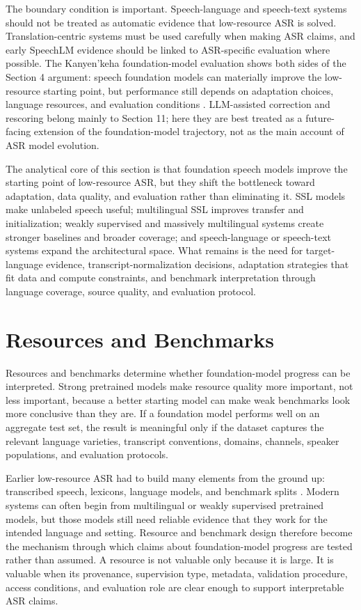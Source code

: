 \documentclass[pdflatex,sn-basic]{sn-jnl}
\theoremstyle{thmstyleone}
\theoremstyle{thmstyletwo}
\theoremstyle{thmstylethree}
\begin{document}
The boundary condition is important. Speech-language and speech-text systems should not be treated as automatic evidence that low-resource ASR is solved. Translation-centric systems must be used carefully when making ASR claims, and early SpeechLM evidence should be linked to ASR-specific evaluation where possible. The Kanyen'keha foundation-model evaluation shows both sides of the Section 4 argument: speech foundation models can materially improve the low-resource starting point, but performance still depends on adaptation choices, language resources, and evaluation conditions \citep{geng25c_interspeech}. LLM-assisted correction and rescoring belong mainly to Section 11; here they are best treated as a future-facing extension of the foundation-model trajectory, not as the main account of ASR model evolution.

The analytical core of this section is that foundation speech models improve the starting point of low-resource ASR, but they shift the bottleneck toward adaptation, data quality, and evaluation rather than eliminating it. SSL models make unlabeled speech useful; multilingual SSL improves transfer and initialization; weakly supervised and massively multilingual systems create stronger baselines and broader coverage; and speech-language or speech-text systems expand the architectural space. What remains is the need for target-language evidence, transcript-normalization decisions, adaptation strategies that fit data and compute constraints, and benchmark interpretation through language coverage, source quality, and evaluation protocol.

\section{Resources and Benchmarks}

Resources and benchmarks determine whether foundation-model progress can be interpreted. Strong pretrained models make resource quality more important, not less important, because a better starting model can make weak benchmarks look more conclusive than they are. If a foundation model performs well on an aggregate test set, the result is meaningful only if the dataset captures the relevant language varieties, transcript conventions, domains, channels, speaker populations, and evaluation protocols.

Earlier low-resource ASR had to build many elements from the ground up: transcribed speech, lexicons, language models, and benchmark splits \citep{besacier2014_underresourced_asr_survey,gales2014_babel_project_research_cued}. Modern systems can often begin from multilingual or weakly supervised pretrained models, but those models still need reliable evidence that they work for the intended language and setting. Resource and benchmark design therefore become the mechanism through which claims about foundation-model progress are tested rather than assumed. A resource is not valuable only because it is large. It is valuable when its provenance, supervision type, metadata, validation procedure, access conditions, and evaluation role are clear enough to support interpretable ASR claims.
\end{document}
